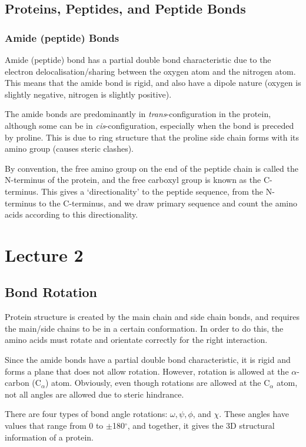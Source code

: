 \documentclass[a4paper, 12pt]{report}
\newcommand{\mychapter}[2]{
    \setcounter{chapter}{#1}
    \setcounter{section}{0}
    \chapter*{#2}
    \addcontentsline{toc}{chapter}{#2}
}
\begin{document}
\section{Proteins, Peptides, and Peptide Bonds}

\subsection{Amide (peptide) Bonds}

Amide (peptide) bond has a partial double bond characteristic due to the electron delocalisation/sharing between the oxygen atom and the nitrogen atom.
This means that the amide bond is rigid, and also have a dipole nature (oxygen is slightly negative, nitrogen is slightly positive).

The amide bonds are predominantly in \textit{trans}-configuration in the protein, although some can be in \textit{cis}-configuration, especially when the bond is preceded by proline.
This is due to ring structure that the proline side chain forms with its amino group (causes steric clashes).

By convention, the free amino group on the end of the peptide chain is called the N-terminus of the protein, and the free carboxyl group is known as the C-terminus.
This gives a `directionality' to the peptide sequence, from the N-terminus to the C-terminus, and we draw primary sequence and count the amino acids according to this directionality.

\mychapter{2}{Lecture 2}

\section{Bond Rotation}

Protein structure is created by the main chain and side chain bonds, and requires the main/side chains to be in a certain conformation.
In order to do this, the amino acids must rotate and orientate correctly for the right interaction.

Since the amide bonds have a partial double bond characteristic, it is rigid and forms a plane that does not allow rotation.
However, rotation is allowed at the $\alpha$-carbon (C$_{\alpha}$) atom.
Obviously, even though rotations are allowed at the C$_{\alpha}$ atom, not all angles are allowed due to steric hindrance.

There are four types of bond angle rotations: $\omega, \psi, \phi$, and $\chi$.
These angles have values that range from 0 to $\pm$180$^{\circ}$, and together, it gives the 3D structural information of a protein.
\end{document}
